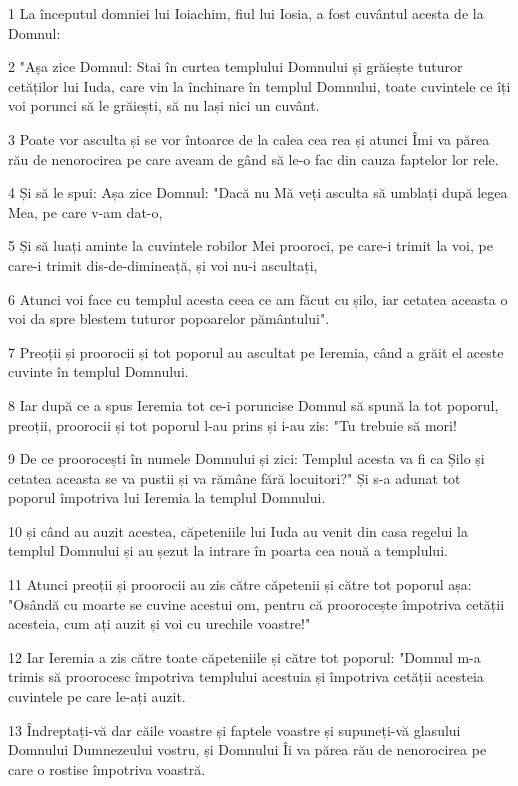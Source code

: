 \par 1 La începutul domniei lui Ioiachim, fiul lui Iosia, a fost cuvântul acesta de la Domnul:
\par 2 "Așa zice Domnul: Stai în curtea templului Domnului și grăiește tuturor cetăților lui Iuda, care vin la închinare în templul Domnului, toate cuvintele ce îți voi porunci să le grăiești, să nu lași nici un cuvânt.
\par 3 Poate vor asculta și se vor întoarce de la calea cea rea și atunci Îmi va părea rău de nenorocirea pe care aveam de gând să le-o fac din cauza faptelor lor rele.
\par 4 Și să le spui: Așa zice Domnul: "Dacă nu Mă veți asculta să umblați după legea Mea, pe care v-am dat-o,
\par 5 Și să luați aminte la cuvintele robilor Mei prooroci, pe care-i trimit la voi, pe care-i trimit dis-de-dimineață, și voi nu-i ascultați,
\par 6 Atunci voi face cu templul acesta ceea ce am făcut cu șilo, iar cetatea aceasta o voi da spre blestem tuturor popoarelor pământului".
\par 7 Preoții și proorocii și tot poporul au ascultat pe Ieremia, când a grăit el aceste cuvinte în templul Domnului.
\par 8 Iar după ce a spus Ieremia tot ce-i poruncise Domnul să spună la tot poporul, preoții, proorocii și tot poporul l-au prins și i-au zis: "Tu trebuie să mori!
\par 9 De ce proorocești în numele Domnului și zici: Templul acesta va fi ca Șilo și cetatea aceasta se va pustii și va rămâne fără locuitori?" Și s-a adunat tot poporul împotriva lui Ieremia la templul Domnului.
\par 10 și când au auzit acestea, căpeteniile lui Iuda au venit din casa regelui la templul Domnului și au șezut la intrare în poarta cea nouă a templului.
\par 11 Atunci preoții și proorocii au zis către căpetenii și către tot poporul așa: "Osândă cu moarte se cuvine acestui om, pentru că proorocește împotriva cetății acesteia, cum ați auzit și voi cu urechile voastre!"
\par 12 Iar Ieremia a zis către toate căpeteniile și către tot poporul: "Domnul m-a trimis să proorocesc împotriva templului acestuia și împotriva cetății acesteia cuvintele pe care le-ați auzit.
\par 13 Îndreptați-vă dar căile voastre și faptele voastre și supuneți-vă glasului Domnului Dumnezeului vostru, și Domnului Îi va părea rău de nenorocirea pe care o rostise împotriva voastră.
